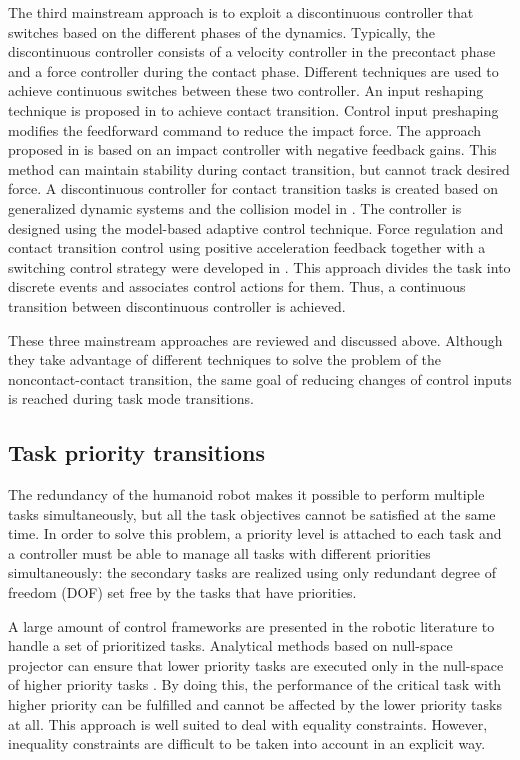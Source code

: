 The third mainstream approach is to exploit a discontinuous controller that switches based on the different phases of the dynamics. Typically, the discontinuous controller consists of a velocity controller in the precontact phase and a force controller during the contact phase. Different techniques are used to achieve continuous switches between these two controller.  An input reshaping technique is proposed in \cite{hyde1993} to achieve contact transition. Control input preshaping modifies the feedforward command to reduce the impact force. The approach proposed in \cite{volpe1993} is based on an impact controller with negative feedback gains. This method can maintain stability during contact transition, but cannot track desired force. A discontinuous controller for contact transition tasks is created based on generalized dynamic systems and the collision model in \cite{akella1994}. The controller is designed using the model-based adaptive control technique. Force regulation and contact transition control using positive acceleration feedback together with a switching control strategy were developed in \cite{tarn1996}. This approach divides the task into discrete events and associates control actions for them. Thus, a continuous transition between discontinuous controller is achieved.

These three mainstream approaches are reviewed and discussed above. Although they take advantage of different techniques to solve the problem of the noncontact-contact transition, the same goal of reducing changes of control inputs is reached during task mode transitions.

\subsection{Task priority transitions}
The redundancy of the humanoid robot makes it possible to perform multiple tasks simultaneously, but all the task objectives cannot be satisfied at the same time. In order to solve this problem, a priority level is attached to each task and a controller must be able to manage all tasks with different priorities simultaneously: the secondary tasks are realized using only redundant degree of freedom (DOF) set free by the tasks that have priorities.

A large amount of control frameworks are presented in the robotic literature to handle a set of prioritized tasks. Analytical methods based on null-space projector can ensure that lower priority tasks are executed only in the null-space of higher priority tasks \cite{liegeois1977,khatib1987,nakamura1990,sentis2004,sentis2010}. By doing this, the performance of the critical task with higher priority can be fulfilled and cannot be affected by the lower priority tasks at all. This approach is well suited to deal with equality constraints. However, inequality constraints are difficult to be taken into account in an explicit way. 

